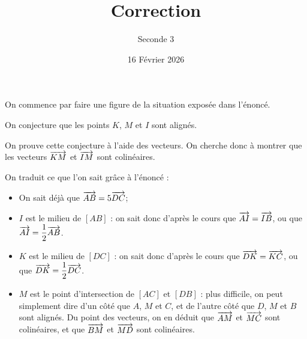 \documentclass{poly}
\title{Correction}
\author{Seconde 3}
\date{16 Février 2026}
\begin{document}
\maketitle

On commence par faire une figure de la situation exposée dans l'énoncé.

\begin{center}
\end{center}

On conjecture que les points $K$, $M$ et $I$ sont alignés.

On prouve cette conjecture à l'aide des vecteurs. On cherche donc à montrer que les vecteurs $\overrightarrow{KM}$ et $\overrightarrow{IM}$ sont colinéaires.

On traduit ce que l'on sait grâce à l'énoncé :
\begin{itemize}
\item On sait déjà que $\overrightarrow{AB} = 5\overrightarrow{DC}$;
\item $I$ est le milieu de $[AB]$ : on sait donc d'après le cours que $\overrightarrow{AI} = \overrightarrow{IB}$, ou que $\overrightarrow{AI}=\dfrac{1}{2}\overrightarrow{AB}$.
\item $K$ est le milieu de $[DC]$ : on sait donc d'après le cours que $\overrightarrow{DK} = \overrightarrow{KC}$, ou que $\overrightarrow{DK}=\dfrac{1}{2}\overrightarrow{DC}$.
\item $M$ est le point d'intersection de $[AC]$ et $[DB]$ : plus difficile, on peut simplement dire d'un côté que $A$, $M$ et $C$, et de l'autre côté que $D$, $M$ et $B$ sont alignés. Du point des vecteurs, on en déduit que $\overrightarrow{AM}$ et $\overrightarrow{MC}$ sont colinéaires, et que $\overrightarrow{BM}$ et $\overrightarrow{MD}$ sont colinéaires.
\end{itemize}

\end{document}
